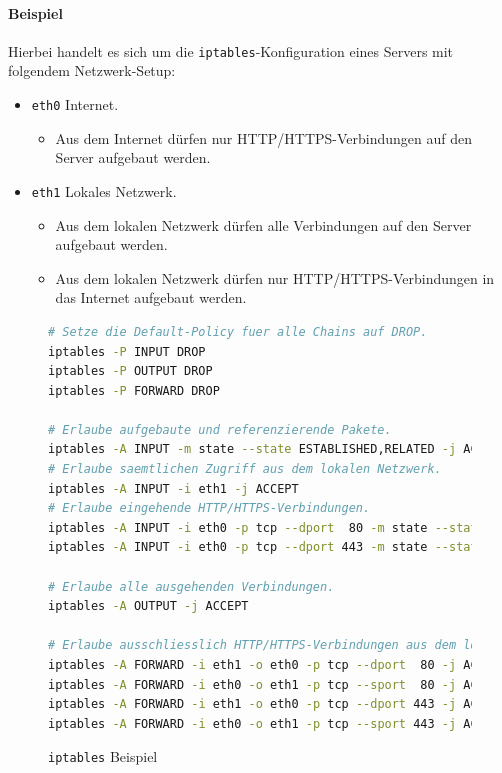 \documentclass[a4paper, 11pt, accentcolor = tud3b]{tudreport}
\begin{document}
			    \paragraph{Beispiel}
					Hierbei handelt es sich um die \texttt{iptables}-Konfiguration eines Servers mit folgendem Netzwerk-Setup:
					\begin{itemize}
						\item \texttt{eth0} \tabto{1cm} Internet.
							\begin{itemize}
								\item Aus dem Internet dürfen nur HTTP/HTTPS-Verbindungen auf den Server aufgebaut werden.
							\end{itemize}
						\item \texttt{eth1} \tabto{1cm} Lokales Netzwerk.
							\begin{itemize}
								\item Aus dem lokalen Netzwerk dürfen alle Verbindungen auf den Server aufgebaut werden.
								\item Aus dem lokalen Netzwerk dürfen nur HTTP/HTTPS-Verbindungen in das Internet aufgebaut werden.
							\end{itemize}
					\end{itemize}
					\begin{figure}[H]
						\centering
						\begin{lstlisting}[language = BASH]
# Setze die Default-Policy fuer alle Chains auf DROP.
iptables -P INPUT DROP
iptables -P OUTPUT DROP
iptables -P FORWARD DROP

# Erlaube aufgebaute und referenzierende Pakete.
iptables -A INPUT -m state --state ESTABLISHED,RELATED -j ACCEPT
# Erlaube saemtlichen Zugriff aus dem lokalen Netzwerk.
iptables -A INPUT -i eth1 -j ACCEPT
# Erlaube eingehende HTTP/HTTPS-Verbindungen.
iptables -A INPUT -i eth0 -p tcp --dport  80 -m state --state NEW -j ACCEPT
iptables -A INPUT -i eth0 -p tcp --dport 443 -m state --state NEW -j ACCEPT

# Erlaube alle ausgehenden Verbindungen.
iptables -A OUTPUT -j ACCEPT

# Erlaube ausschliesslich HTTP/HTTPS-Verbindungen aus dem lokalen Netzwerk.
iptables -A FORWARD -i eth1 -o eth0 -p tcp --dport  80 -j ACCEPT
iptables -A FORWARD -i eth0 -o eth1 -p tcp --sport  80 -j ACCEPT
iptables -A FORWARD -i eth1 -o eth0 -p tcp --dport 443 -j ACCEPT
iptables -A FORWARD -i eth0 -o eth1 -p tcp --sport 443 -j ACCEPT
\end{lstlisting}
						\caption{\texttt{iptables} Beispiel}
					\end{figure}
\end{document}
